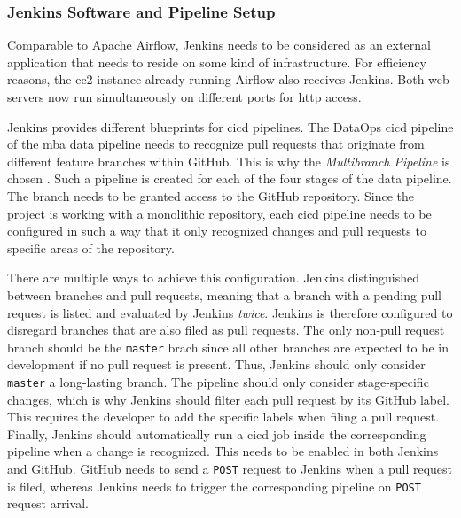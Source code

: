 \subsubsection{Jenkins Software and Pipeline Setup}
Comparable to Apache Airflow, Jenkins needs to be considered as an external application that needs to reside on some kind of infrastructure. For efficiency reasons, the \ac{ec2} instance already running Airflow also receives Jenkins. Both web servers now run simultaneously on different ports for \acs{http} access.

Jenkins provides different blueprints for \ac{cicd} pipelines. The DataOps \ac{cicd} pipeline of the \ac{mba} data pipeline needs to recognize pull requests that originate from different feature branches within GitHub. This is why the \textit{Multibranch Pipeline} is chosen \cite{jenkins}. Such a pipeline is created for each of the four stages of the data pipeline. The branch needs to be granted access to the GitHub repository. Since the project is working with a monolithic repository, each \ac{cicd} pipeline needs to be configured in such a way that it only recognized changes and pull requests to specific areas of the repository.

There are multiple ways to achieve this configuration. Jenkins distinguished between branches and pull requests, meaning that a branch with a pending pull request is listed and evaluated by Jenkins \textit{twice}. Jenkins is therefore configured to disregard branches that are also filed as pull requests. The only non-pull request branch should be the \texttt{master} brach since all other branches are expected to be in development if no pull request is present. Thus, Jenkins should only consider \texttt{master} a long-lasting branch. The pipeline should only consider stage-specific changes, which is why Jenkins should filter each pull request by its GitHub label. This requires the developer to add the specific labels when filing a pull request. Finally, Jenkins should automatically run a \ac{cicd} job inside the corresponding pipeline when a change is recognized. This needs to be enabled in both Jenkins and GitHub. GitHub needs to send a \texttt{POST} request to Jenkins when a pull request is filed, whereas Jenkins needs to trigger the corresponding pipeline on \texttt{POST} request arrival.

